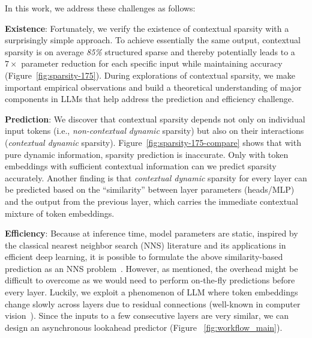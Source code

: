 In this work, we address these challenges as follows:

\textbf{Existence}: Fortunately, we verify the existence of contextual sparsity with a surprisingly simple approach. To achieve essentially the same output, contextual sparsity is on average \textit{85\%} structured sparse and thereby potentially leads to a $7\times$ parameter reduction for each specific input while maintaining accuracy (Figure~\ref{fig:sparsity-175}). During explorations of contextual sparsity, we make important empirical observations and build a theoretical understanding of major components in LLMs that help address the prediction and efficiency challenge.

\textbf{Prediction}: We discover that contextual sparsity depends not only on individual input tokens (i.e., \emph{non-contextual} \emph{dynamic} sparsity) but also on their interactions (\emph{contextual dynamic} sparsity). Figure~\ref{fig:sparsity-175-compare} shows that with pure dynamic information, sparsity prediction is inaccurate. Only with token embeddings with sufficient contextual information can we predict sparsity accurately. Another finding is that \emph{contextual dynamic} sparsity for every layer can be predicted based on the ``similarity'' between layer parameters (heads/MLP) and the output from the previous layer, which carries the immediate contextual mixture of token embeddings.  






\textbf{Efficiency}: Because at inference time, model parameters are static, inspired by the classical nearest neighbor search (NNS) literature and its applications in efficient deep learning, it is possible to formulate the above similarity-based prediction as an NNS problem~\cite{indyk1998approximate,zhang2018navigating,chen2020slide}. However, as mentioned, the overhead might be difficult to overcome as we would need to perform on-the-fly predictions before every layer. Luckily, we exploit a phenomenon of LLM where token embeddings change slowly across layers due to residual connections (well-known in computer vision~\cite{he2016deep}). Since the inputs to a few consecutive layers are very similar, we can design an asynchronous lookahead predictor (Figure ~\ref{fig:workflow_main}).




